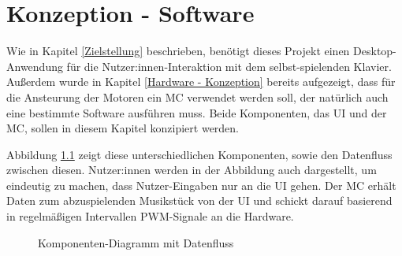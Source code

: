 
\nocite{*}
\chapter{Konzeption - Software} \label{vorgehenSW}

Wie in Kapitel \ref{Zielstellung} beschrieben, benötigt dieses Projekt einen Desktop-Anwendung für die Nutzer:innen-Interaktion mit dem selbst-spielenden Klavier.
Außerdem wurde in Kapitel \ref{Hardware - Konzeption} bereits aufgezeigt, dass für die Ansteurung der Motoren ein \ac{MC} verwendet werden soll, der natürlich auch eine bestimmte Software ausführen muss.
Beide Komponenten, das \ac{UI} und der \ac{MC}, sollen in diesem Kapitel konzipiert werden.

Abbildung \ref*{fig:high-level-komponenten} zeigt diese unterschiedlichen Komponenten, sowie den Datenfluss zwischen diesen.
Nutzer:innen werden in der Abbildung auch dargestellt, um eindeutig zu machen, dass Nutzer-Eingaben nur an die \ac{UI} gehen.
Der \ac{MC} erhält Daten zum abzuspielenden Musikstück von der \ac{UI} und schickt darauf basierend in regelmäßigen Intervallen \ac{PWM}-Signale an die Hardware.

\begin{figure}[htbp]
    \centering
    \caption{Komponenten-Diagramm mit Datenfluss}
    \label{fig:high-level-komponenten}
\end{figure}

